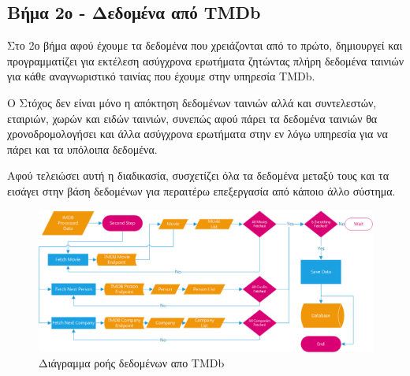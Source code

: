 \subsection{Βήμα 2ο - Δεδομένα από TMDb}
Στο 2ο βήμα αφού έχουμε τα δεδομένα που χρειάζονται από το πρώτο, δημιουργεί και προγραμματίζει για εκτέλεση ασύγχρονα ερωτήματα ζητώντας πλήρη δεδομένα ταινιών για κάθε αναγνωριστικό ταινίας που έχουμε στην υπηρεσία TMDb. 

Ο Στόχος δεν είναι μόνο η απόκτηση δεδομένων ταινιών αλλά και συντελεστών, εταιριών, χωρών
και ειδών ταινιών, συνεπώς αφού πάρει τα δεδομένα ταινιών θα χρονοδρομολογήσει και άλλα ασύγχρονα ερωτήματα στην εν λόγω υπηρεσία για να πάρει και τα υπόλοιπα δεδομένα. 

Αφού τελειώσει αυτή η διαδικασία, συσχετίζει όλα τα δεδομένα μεταξύ τους και τα εισάγει στην βάση δεδομένων για περαιτέρω επεξεργασία από κάποιο άλλο σύστημα. 
\begin{figure}[h]
  \centering
  \includegraphics[width=150mm]{Chapters/5 - Architecture/Import/Images/tmdb_flowchart.png}
  \caption{Διάγραμμα ροής δεδομένων απο TMDb}
  \label{flowchart:tmdbImport}
\end{figure}